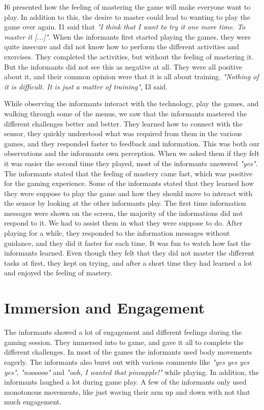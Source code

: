 I6 presented how the feeling of mastering the game will make everyone want to play. In addition to this, the desire to master could lead to wanting to play the game over again. I1 said that \emph{"I think that I want to try it one more time. To master it [...]"}. When the informants first started playing the games, they were quite insecure and did not know how to perform the different activities and exercises. They completed the activities, but without the feeling of mastering it. But the informants did not see this as negative at all. They were all positive about it, and their common opinion were that it is all about training. \emph{"Nothing of it is difficult. It is just a matter of training"}, I3 said. 

While observing the informants interact with the technology, play the games, and walking through some of the menus, we saw that the informants mastered the different challenges better and better. They learned how to connect with the sensor, they quickly understood what was required from them in the various games, and they responded faster to feedback and information. This was both our observations and the informants own perception. When we asked them if they felt it was easier the second time they played, most of the informants answered \emph{"yes"}. The informants stated that the feeling of mastery came fast, which was positive for the gaming experience. Some of the informants stated that they learned how they were suppose to play the game and how they should move to interact with the sensor by looking at the other informants play. The first time information messages were shown on the screen, the majority of the informations did not respond to it. We had to assist them in what they were suppose to do. After playing for a while, they responded to the information messages without guidance, and they did it faster for each time. It was fun to watch how fast the informants learned. Even though they felt that they did not master the different tasks at first, they kept on trying, and after a short time they had learned a lot and enjoyed the feeling of mastery. 

\section{Immersion and Engagement}
The informants showed a lot of engagement and different feelings during the gaming session. They immersed into to game, and gave it all to complete the different challenges. In most of the games the informants used body movements eagerly. The informants also burst out with various comments like \emph{"yes yes yes yes"}, \emph{"noooooo"} and \emph{"ooh, I wanted that pineapple!"} while playing. In addition, the informants laughed a lot during game play. A few of the informants only used monotonous movements, like just waving their arm up and down with not that much engagement.  

